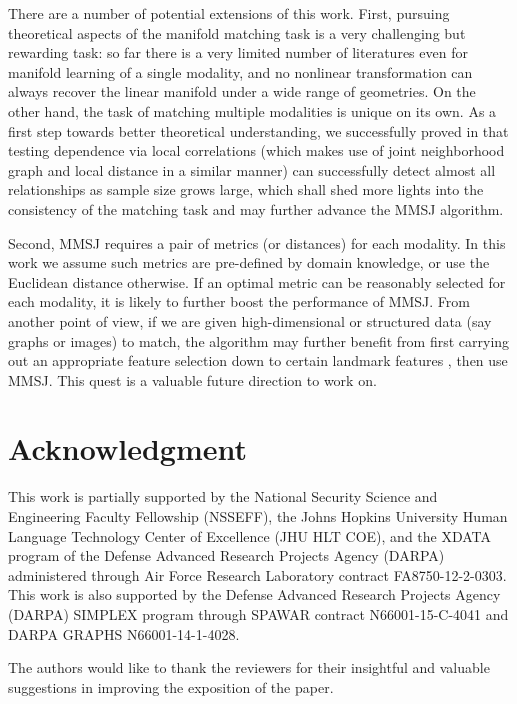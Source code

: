 \documentclass[times,twocolumn,final]{elsarticle}
\begin{document}
There are a number of potential extensions of this work. First, pursuing theoretical aspects of the manifold matching task is a very challenging but rewarding task: so far there is a very limited number of literatures even for manifold learning of a single modality, and no nonlinear transformation can always recover the linear manifold under a wide range of geometries. On the other hand, the task of matching multiple modalities is unique on its own. As a first step towards better theoretical understanding, we successfully proved in \cite{ShenEtAl2017} that testing dependence via local correlations (which makes use of joint neighborhood graph and local distance in a similar manner) can successfully detect almost all relationships as sample size grows large, which shall shed more lights into the consistency of the matching task and may further advance the MMSJ algorithm.

Second, MMSJ requires a pair of metrics (or distances) for each modality. In this work we assume such metrics are pre-defined by domain knowledge, or use the Euclidean distance otherwise. If an optimal metric can be reasonably selected for each modality, it is likely to further boost the performance of MMSJ. From another point of view, if we are given high-dimensional or structured data (say graphs or images) to match, the algorithm may further benefit from first carrying out an appropriate feature selection down to certain landmark features \citep{JJ2008, ConteEtAl2004, FioriEtAl2013}, then use MMSJ. This quest is a valuable future direction to work on.

\section*{Acknowledgment}
This work is partially supported by the National Security Science and Engineering Faculty Fellowship (NSSEFF),
 the Johns Hopkins University Human Language Technology Center of Excellence (JHU HLT COE), and the
 XDATA program of the Defense Advanced Research Projects Agency (DARPA) administered through Air Force Research Laboratory contract FA8750-12-2-0303. This work is also supported by the Defense Advanced Research Projects Agency (DARPA) SIMPLEX program through SPAWAR contract N66001-15-C-4041 and DARPA GRAPHS N66001-14-1-4028.

The authors would like to thank the reviewers for their insightful and valuable suggestions in improving the exposition of the paper.





\end{document}
